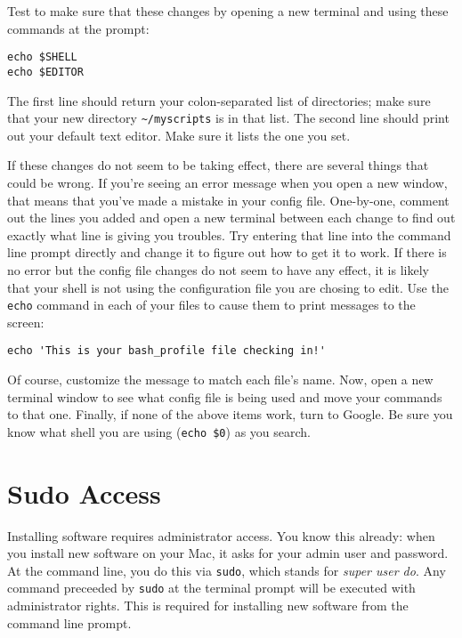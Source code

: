 \documentclass[12pt, letterpaper]{article}
\begin{document}
Test to make sure that these changes by opening a new terminal and using these
commands at the prompt:
\begin{verbatim}
echo $SHELL
echo $EDITOR
\end{verbatim}
The first line should return your colon-separated list of directories; make sure
that your new directory {\tt \textasciitilde/myscripts} is in that list.
The second line should print out your default text editor.  Make sure it lists
the one you set.

If these changes do not seem to be taking effect, there are several things that
could be wrong.  If you're seeing an error message when you open a new window,
that means that you've made a mistake in your config file.  One-by-one,
comment out the lines you added and open a new terminal between each change to
find out exactly what line is giving you troubles.  Try entering that line
into the command line prompt directly and change it to figure out how to get it
to work.  If there is no error but the config file changes do not seem to have
any effect, it is likely that your shell is not using the configuration file
you are chosing to edit.  Use the {\tt echo} command in each of your files
to cause them to print messages to the screen:
\begin{verbatim}
echo 'This is your bash_profile file checking in!'
\end{verbatim}
Of course, customize the message to match each file's name.  Now, open a new
terminal window to see what config file is being used and move your commands
to that one.  Finally, if none of the above items work, turn to Google.  Be
sure you know what shell you are using ({\tt echo \$0}) as you search.

\section{Sudo Access}
Installing software requires administrator access.  You know this already:
when you install new software on your Mac, it asks for your admin user and
password.  At the command line, you do this via {\tt sudo}, which stands
for \emph{super user do}.  Any command preceeded by {\tt sudo} at the
terminal prompt will be executed with administrator rights.  This is required
for installing new software from the command line prompt.
\end{document}
